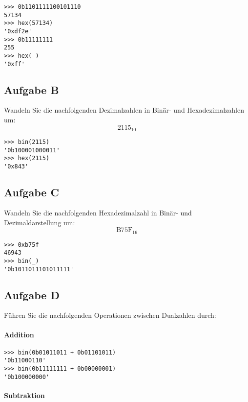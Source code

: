 \begin{verbatim}
>>> 0b1101111100101110
57134
>>> hex(57134)
'0xdf2e'
>>> 0b11111111
255
>>> hex(_)
'0xff'
\end{verbatim}

\subsection{Aufgabe B}

\begin{problem}
	Wandeln Sie die nachfolgenden Dezimalzahlen in Binär- und Hexadezimalzahlen
	um:
	\[
		2115_{10}
	\]
\end{problem}

\begin{verbatim}
>>> bin(2115)
'0b100001000011'
>>> hex(2115)
'0x843'
\end{verbatim}

\subsection{Aufgabe C}

\begin{problem}
	Wandeln Sie die nachfolgenden Hexadezimalzahl in Binär- und
	Dezimaldarstellung um:
	\[
		\mathrm{B75F}_{16}
	\]
\end{problem}

\begin{verbatim}
>>> 0xb75f
46943
>>> bin(_)
'0b1011011101011111'
\end{verbatim}

\subsection{Aufgabe D}

\begin{problem}
	Führen Sie die nachfolgenden Operationen zwischen Dualzahlen durch:
\end{problem}

\paragraph{Addition}

\begin{verbatim}
>>> bin(0b01011011 + 0b01101011)
'0b11000110'
>>> bin(0b11111111 + 0b00000001)
'0b100000000'
\end{verbatim}

\paragraph{Subtraktion}

